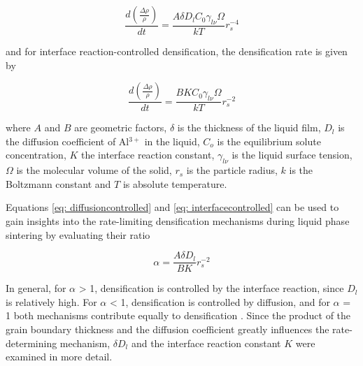 \begin{equation}
\label{eq: diffusioncontrolled}
\frac{d\left( \frac{\Delta \rho}{\rho} \right)}{dt} = \frac{A \delta D_{l} C_{0} \gamma_{l \nu} \Omega}{kT} r_{s}^{-4}
\end{equation}

\noindent and for interface reaction-controlled densification, the densification rate is given by 

\begin{equation}
\label{eq: interfacecontrolled}
\frac{d\left( \frac{\Delta \rho}{\rho} \right)}{dt} = \frac{B K C_{0} \gamma_{l \nu} \Omega}{kT} r_{s}^{-2}
\end{equation}

\noindent where $A$ and $B$ are geometric factors, $\delta$ is the thickness of the liquid film, $D_{l}$ is the diffusion coefficient of Al$^{3+}$ in the liquid, $C_{o}$ is the equilibrium solute concentration, $K$ the interface reaction constant, $\gamma_{l \nu}$ is the liquid surface tension, $\Omega$ is the molecular volume of the solid, $r_{s}$ is the particle radius, $k$ is the Boltzmann constant and $T$ is absolute temperature.

Equations \ref{eq: diffusioncontrolled} and \ref{eq: interfacecontrolled} can be used to gain insights into the rate-limiting densification mechanisms during liquid phase sintering by evaluating their ratio \cite{Kwon1990,Kwon1991}

\begin{equation}
\label{eq: densmech}
\alpha = \frac{A \delta D_{l}}{BK}r_{s}^{-2}
\end{equation}

In general, for $\alpha$ > 1, densification is controlled by the interface reaction, since $D_{l}$ is relatively high.  For $\alpha$ < 1, densification is controlled by diffusion, and for $\alpha$ = 1 both mechanisms contribute equally to densification \cite{Kwon1991}. Since the product of the grain boundary thickness and the diffusion coefficient greatly influences the rate-determining mechanism, $\delta D_{l}$ and the interface reaction constant $K$ were examined in more detail. 

